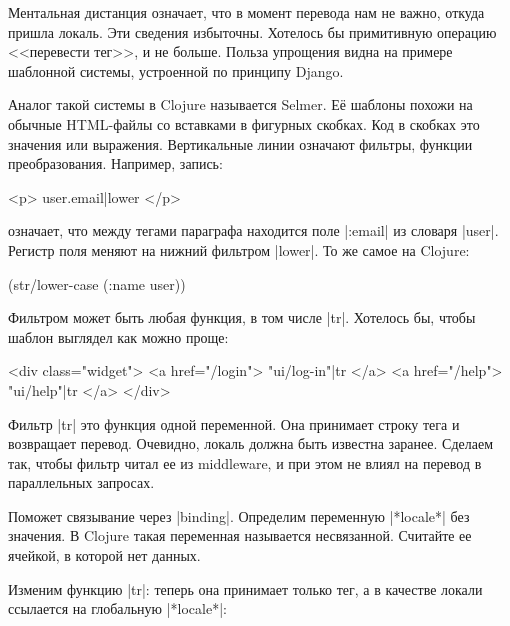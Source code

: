Ментальная дистанция означает, что в момент перевода нам не важно, откуда пришла
локаль. Эти сведения избыточны. Хотелось бы примитивную операцию <<перевести
тег>>, и не больше. Польза упрощения видна на примере шаблонной системы,
устроенной по принципу
Django.

Аналог такой системы в Clojure называется
Selmer. Е\"{е} шаблоны похожи на
обычные HTML-файлы со вставками в фигурных скобках. Код в скобках это значения
или выражения. Вертикальные линии означают фильтры, функции
преобразования. Например, запись:

\begin{english}
  \begin{htmldjango}
<p>{{ user.email|lower }}</p>
  \end{htmldjango}
\end{english}

\noindent
означает, что между тегами параграфа находится поле \spverb|:email| из словаря
\spverb|user|. Регистр поля меняют на нижний фильтром \spverb|lower|. То же
самое на Clojure:

\begin{english}
  \begin{clojure}
(str/lower-case (:name user))
  \end{clojure}
\end{english}

Фильтром может быть любая функция, в том числе \spverb|tr|. Хотелось бы,
чтобы шаблон выглядел как можно проще:

\begin{english}
  \begin{htmldjango}
<div class="widget">
  <a href="/login">{{ "ui/log-in"|tr }}</a>
  <a href="/help">{{ "ui/help"|tr }}</a>
</div>
  \end{htmldjango}
\end{english}

Фильтр \spverb|tr| это функция одной переменной. Она принимает строку тега и
возвращает перевод. Очевидно, локаль должна быть известна заранее. Сделаем так,
чтобы фильтр читал ее из middleware, и при этом не влиял на перевод в параллельных
запросах.

Поможет связывание через \spverb|binding|. Определим переменную
\spverb|*locale*| без значения. В Clojure такая переменная называется
несвязанной. Считайте ее ячейкой, в которой нет данных.

Изменим функцию \spverb|tr|: теперь она принимает только тег, а в качестве
локали ссылается на глобальную \spverb|*locale*|:

